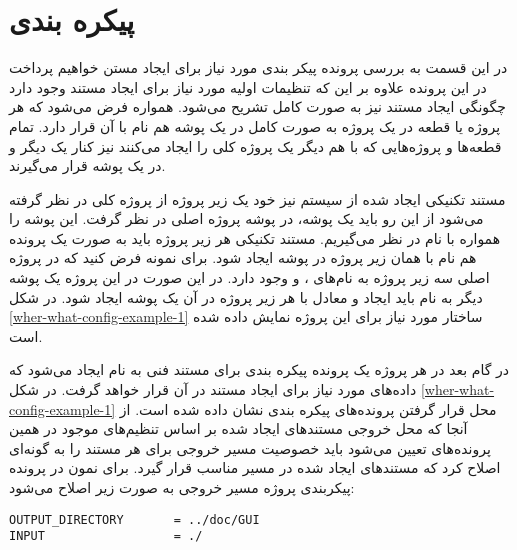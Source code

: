 %
% 
% 
% 
%
\section{پیکره بندی}
در این قسمت به بررسی پرونده پیکر بندی مورد نیاز برای ایجاد مستن خواهیم پرداخت
در این پرونده علاوه بر این که تنظیمات اولیه مورد نیاز برای ایجاد مستند وجود
دارد چگونگی ایجاد مستند نیز به صورت کامل تشریح می‌شود. همواره فرض می‌شود که هر
پروژه یا قطعه در یک پروژه به صورت کامل در یک پوشه هم نام با آن قرار دارد. تمام
قطعه‌ها و پروژه‌هایی که با هم دیگر یک پروژه کلی را ایجاد می‌کنند نیز کنار یک
دیگر و در یک پوشه قرار می‌گیرند.

مستند تکنیکی ایجاد شده از سیستم نیز خود یک زیر پروژه از پروژه کلی در نظر گرفته
می‌شود از این رو باید یک پوشه، در پوشه پروژه اصلی در نظر گرفت. این پوشه را
همواره با نام  در نظر می‌گیریم. مستند تکنیکی هر زیر پروژه باید به صورت
یک پرونده هم نام با همان زیر پروژه در پوشه  ایجاد شود. برای نمونه فرض
کنید که در پروژه اصلی سه زیر پروژه به نام‌های ،  و 
وجود دارد. در این صورت در این پروژه یک پوشه دیگر به نام  باید ایجاد
و معادل با هر زیر پروژه در آن یک پوشه ایجاد شود. در شکل
\ref{wher-what-config-example-1} ساختار مورد نیاز برای این پروژه نمایش داده
شده است.

در گام بعد در هر پروژه یک پرونده پیکره بندی برای مستند فنی به نام 
ایجاد می‌شود که داده‌های مورد نیاز برای ایجاد مستند در آن قرار خواهد گرفت. در
شکل \ref{wher-what-config-example-1} محل قرار گرفتن پرونده‌های پیکره بندی نشان
داده شده است. از آنجا که محل خروجی مستندهای ایجاد شده بر اساس تنظیم‌های موجود
در همین پرونده‌های تعیین می‌شود باید خصوصیت مسیر خروجی برای هر مستند را به
گونه‌ای اصلاح کرد که مستندهای ایجاد شده در مسیر مناسب قرار گیرد. برای نمون در
پرونده پیکربندی پروژه  مسیر خروجی به صورت زیر اصلاح می‌شود:

\begin{latin}
\lstset{language=bash}  
\begin{lstlisting}[frame=single] 
OUTPUT_DIRECTORY       = ../doc/GUI
INPUT                  = ./
\end{lstlisting}
\end{latin}

